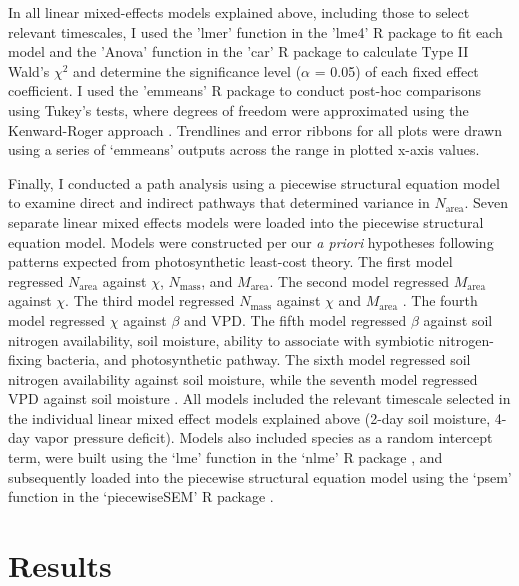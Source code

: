 In all linear mixed-effects models explained above, including those to select relevant timescales, I used the 'lmer' function in the 'lme4' R package  to fit each model and the 'Anova' function in the 'car' R package  to calculate Type II Wald's $\chi^2$ and determine the significance level ($\alpha$ = 0.05) of each fixed effect coefficient. I used the 'emmeans' R package  to conduct post-hoc comparisons using Tukey's tests, where degrees of freedom were approximated using the Kenward-Roger approach . Trendlines and error ribbons for all plots were drawn using a series of ‘emmeans’ outputs across the range in plotted x-axis values.

Finally, I conducted a path analysis using a piecewise structural equation model to examine direct and indirect pathways that determined variance in $N_\mathrm{area}$. Seven separate linear mixed effects models were loaded into the piecewise structural equation model. Models were constructed per our \textit{a priori} hypotheses following patterns expected from photosynthetic least-cost theory. The first model regressed $N_\mathrm{area}$ against $\chi$, $N_\mathrm{mass}$, and $M_\mathrm{area}$. The second model regressed $M_\mathrm{area}$ against $\chi$. The third model regressed $N_\mathrm{mass}$ against $\chi$ and $M_\mathrm{area}$ . The fourth model regressed $\chi$ against $\beta$ and VPD. The fifth model regressed $\beta$ against soil nitrogen availability, soil moisture, ability to associate with symbiotic nitrogen-fixing bacteria, and photosynthetic pathway. The sixth model regressed soil nitrogen availability against soil moisture, while the seventh model regressed VPD against soil moisture . All models included the relevant timescale selected in the individual linear mixed effect models explained above (2-day soil moisture, 4-day vapor pressure deficit). Models also included species as a random intercept term, were built using the ‘lme’ function in the ‘nlme’ R package , and subsequently loaded into the piecewise structural equation model using the ‘psem’ function in the ‘piecewiseSEM’ R package .

\section{Results}
